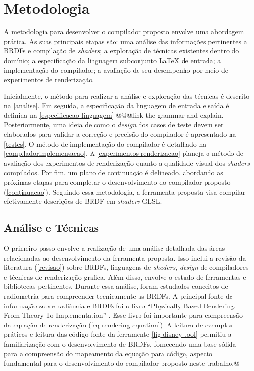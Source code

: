 \chapter{Metodologia} \label{metodologia}

A metodologia para desenvolver o compilador proposto envolve uma abordagem prática. As suas principais etapas são: uma análise das informações pertinentes a BRDFs e compilação de \textit{shaders}; a exploração de técnicas existentes dentro do domínio; a especificação da linguagem subconjunto \LaTeX{} de entrada;  a implementação do compilador; a avaliação de seu desempenho por meio de experimentos de renderização.

Inicialmente, o método para realizar a análise e exploração das técnicas é descrito na \autoref{analise}. Em seguida, a especificação da linguagem de entrada e saída é definida na \autoref{especificacao-linguagem} @@@{link the grammar and explain}. Posteriormente, uma ideia de como o \textit{design} dos casos de teste devem ser elaborados para validar a correção e precisão do compilador é apresentado na \autoref{testes}. O método de implementação do compilador é detalhado na \autoref{compiladorimplementacao}. A \autoref{experimentos-renderizacao} planeja o método de avaliação dos experimentos de renderização quanto a qualidade visual dos \textit{shaders} compilados. Por fim, um plano de continuação é delineado, abordando as próximas etapas para completar o desenvolvimento do compilador proposto (\autoref{continuacao}).
Seguindo essa metodologia, a ferramenta proposta visa compilar efetivamente descrições de BRDF em \textit{shaders} GLSL.


\section{Análise e Técnicas} \label{analise}




O primeiro passo envolve a realização de uma análise detalhada das áreas relacionadas ao desenvolvimento da ferramenta proposta. Isso inclui a revisão da literatura (\autoref{revisao}) sobre BRDFs, linguagens de \textit{shaders}, \textit{design} de compiladores e técnicas de renderização gráfica. Além disso, envolve o estudo de ferramentas e bibliotecas pertinentes. Durante essa análise, foram estudados conceitos de radiometria para compreender tecnicamente as BRDFs. A principal fonte de informação sobre radiância e BRDFs foi o livro ``Physically Based Rendering: From Theory To Implementation'' \cite{pbr}. Esse livro foi importante para compreensão da equação de renderização (\autoref{eq-rendering-equation}). A leitura de exemplos práticos e leitura das código fonte da ferramente \autoref{fig-disney-tool} permitiu a familiarização com o desenvolvimento de BRDFs, fornecendo uma base sólida para a compreensão do mapeamento da equação para código, aspecto fundamental para o desenvolvimento do compilador proposto neste trabalho.@

